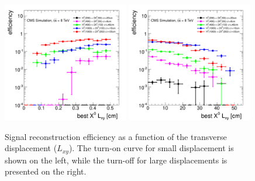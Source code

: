 \begin{figure}[htbp]
\includegraphics[width=0.49\textwidth]{plots/signal/effSmallLxy.pdf}
\includegraphics[width=0.49\textwidth]{plots/signal/effLxy.pdf}
\caption{Signal reconstruction efficiency as a function of the \X transverse 
displacement ($L_{xy}$). The turn-on curve for small displacement is shown on the left,
while the turn-off for large displacements is presented on the right.\label{fig:effLxy}}
\end{figure}

